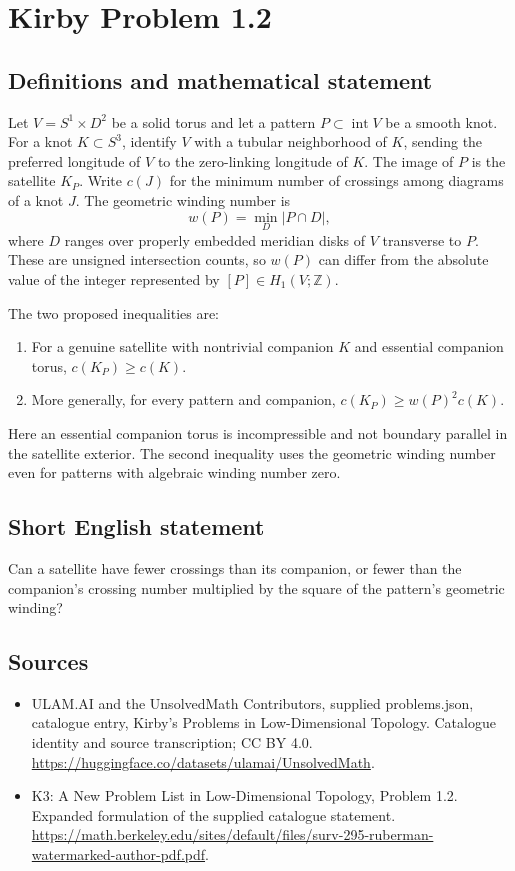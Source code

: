 \documentclass[11pt,a4paper]{article}
\begin{document}
\section*{Kirby Problem 1.2}\label{statement}

\subsection{Definitions and mathematical statement}
Let $V=S^1\times D^2$ be a solid torus and let a pattern $P\subset\operatorname{int}V$
be a smooth knot. For a knot $K\subset S^3$, identify $V$ with a tubular neighborhood
of $K$, sending the preferred longitude of $V$ to the zero-linking longitude of
$K$. The image of $P$ is the satellite $K_P$.
Write $c(J)$ for the minimum number of crossings among diagrams of a knot $J$.
The geometric winding number is
\[
w(P)=\min_D |P\cap D|,
\]
where $D$ ranges over properly embedded meridian disks of $V$ transverse to $P$.
These are unsigned intersection counts, so $w(P)$ can differ from the absolute
value of the integer represented by $[P]\in H_1(V;\mathbb Z)$.

The two proposed inequalities are:
\begin{enumerate}
\item For a genuine satellite with nontrivial companion $K$ and essential companion
torus, $c(K_P)\geq c(K)$.
\item More generally, for every pattern and companion,
$c(K_P)\geq w(P)^2c(K)$.
\end{enumerate}
Here an essential companion torus is incompressible and not boundary parallel in
the satellite exterior. The second inequality uses the geometric winding number
even for patterns with algebraic winding number zero.
\subsection{Short English statement}
Can a satellite have fewer crossings than its companion, or fewer than the companion's crossing number multiplied by the square of the pattern's geometric winding?
\subsection{Sources}
\begin{itemize}
\item[S1] ULAM.AI and the UnsolvedMath Contributors, supplied problems.json, catalogue entry, Kirby's Problems in Low-Dimensional Topology. Catalogue identity and source transcription; CC BY 4.0.
\url{https://huggingface.co/datasets/ulamai/UnsolvedMath}.
\item[S2] K3: A New Problem List in Low-Dimensional Topology, Problem 1.2. Expanded formulation of the supplied catalogue statement.
\url{https://math.berkeley.edu/sites/default/files/surv-295-ruberman-watermarked-author-pdf.pdf}.
\end{itemize}
\end{document}
